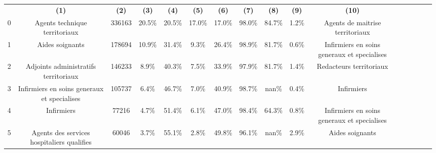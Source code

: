 \documentclass[10pt]{article}
\begin{document}
	





\begin{landscape}
	\begin{longtable}{ | p{0.5cm} |*{15}{c|} }

& \textbf{(1)} & \textbf{(2)} & \textbf{(3)} & \textbf{(4)} & \textbf{(5)} & \textbf{(6)} & \textbf{(7)} & \textbf{(8)} & \textbf{(9)} & \textbf{(10)} \\
0   &                      Agents technique territoriaux &         336163 &          20.5\% &                  20.5\% &                17.0\% &                    17.0\% &              98.0\% &                             84.7\% &                                     1.2\% &                    Agents de maitrise territoriaux \\
1   &                                    Aides soignants &         178694 &          10.9\% &                  31.4\% &                 9.3\% &                    26.4\% &              98.9\% &                             81.7\% &                                     0.6\% &        Infirmiers en soins generaux et specialises \\
2   &               Adjoints administratifs territoriaux &         146233 &           8.9\% &                  40.3\% &                 7.5\% &                    33.9\% &              97.9\% &                             81.7\% &                                     1.4\% &                            Redacteurs territoriaux \\
3   &        Infirmiers en soins generaux et specialises &         105737 &           6.4\% &                  46.7\% &                 7.0\% &                    40.9\% &              98.7\% &                              nan\% &                                     0.4\% &                                         Infirmiers \\
4   &                                         Infirmiers &          77216 &           4.7\% &                  51.4\% &                 6.1\% &                    47.0\% &              98.4\% &                             64.3\% &                                     0.8\% &        Infirmiers en soins generaux et specialises \\
5   &         Agents des services hospitaliers qualifies &          60046 &           3.7\% &                  55.1\% &                 2.8\% &                    49.8\% &              96.1\% &                              nan\% &                                     2.9\% &                                    Aides soignants \\

\end{longtable}
\end{landscape}
\end{document}
